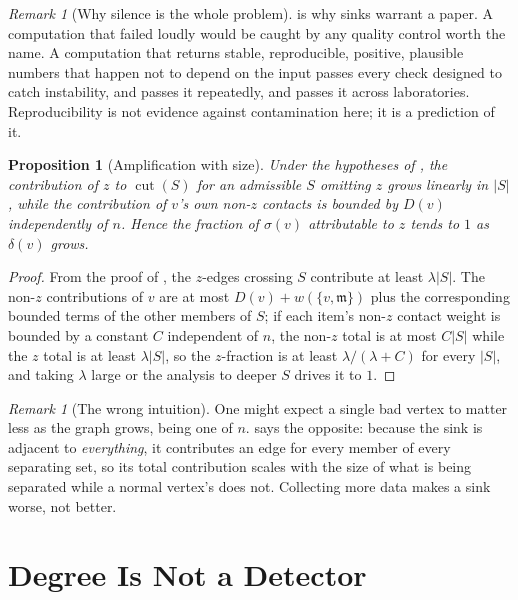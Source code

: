 \documentclass[11pt,a4paper]{article}
\newtheorem{proposition}[theorem]{Proposition}
\theoremstyle{definition}
\theoremstyle{remark}
\newtheorem{remark}[theorem]{Remark}
\newcommand{\wt}{w}
\newcommand{\med}{\mathfrak{m}}
\newcommand{\cut}{\operatorname{cut}}
\newcommand{\sep}{\sigma}
\newcommand{\dep}{\delta}
\begin{document}
\begin{remark}[Why silence is the whole problem]\label{rem:silence}
 is why sinks warrant a paper. A computation that failed
loudly would be caught by any quality control worth the name. A
computation that returns stable, reproducible, positive, plausible
numbers that happen not to depend on the input passes every check
designed to catch instability, and passes it repeatedly, and passes it
across laboratories. Reproducibility is not evidence against
contamination here; it is a prediction of it.
\end{remark}

\begin{proposition}[Amplification with size]\label{prop:amplify}
Under the hypotheses of , the contribution of $z$ to
$\cut(S)$ for an admissible $S$ omitting $z$ grows linearly in $|S|$,
while the contribution of $v$'s own non-$z$ contacts is bounded by $D(v)$
independently of $n$. Hence the fraction of $\sep(v)$ attributable to $z$
tends to $1$ as $\dep(v)$ grows.
\end{proposition}

\begin{proof}
From the proof of , the $z$-edges crossing $S$
contribute at least $\lambda|S|$. The non-$z$ contributions of $v$ are at
most $D(v) + \wt(\{v,\med\})$ plus the corresponding bounded terms of the
other members of $S$; if each item's non-$z$ contact weight is bounded by
a constant $C$ independent of $n$, the non-$z$ total is at most $C|S|$
while the $z$ total is at least $\lambda|S|$, so the $z$-fraction is at
least $\lambda/(\lambda+C)$ for every $|S|$, and taking $\lambda$ large
or the analysis to deeper $S$ drives it to $1$.
\end{proof}

\begin{remark}[The wrong intuition]\label{rem:dilution}
One might expect a single bad vertex to matter less as the graph grows,
being one of $n$.  says the opposite: because the sink
is adjacent to \emph{everything}, it contributes an edge for every member
of every separating set, so its total contribution scales with the size
of what is being separated while a normal vertex's does not. Collecting
more data makes a sink worse, not better.
\end{remark}

\section{Degree Is Not a Detector}
\label{sec:degree}
\end{document}
